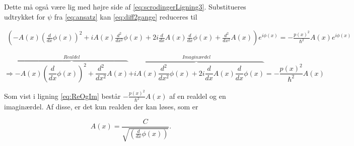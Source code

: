 Dette må også være lig med højre side af \cref{eq:scrodingerLigning3}. Substitueres udtrykket for $\psi$ fra \cref{eq:ansatz} kan \cref{eq:diff2gange} reduceres til

\begin{align}
    \left(- A{\left (x \right )} \left(\frac{d}{d x} \phi{\left (x \right )}\right)^{2} + i A{\left (x \right )} \frac{d^{2}}{d x^{2}}  \phi{\left (x \right )} + 2 i \frac{d}{d x} A{\left (x \right )} \frac{d}{d x} \phi{\left (x \right )} + \frac{d^{2}}{d x^{2}}  A{\left (x \right )}\right) e^{i \phi{\left (x \right )}} = - \frac{p(x)^2}{\hbar^2} A(x) e^{i \phi(x)}
    \label{eq:udskrevet}
\end{align}

\begin{equation}
     \Rightarrow
     \overbrace{- A{\left(x \right)} \left(\frac{d}{d x} \phi{\left(x \right)}\right)^{2}
     + \frac{d^{2}}{d x^{2}}  A{\left (x \right )}}^{Realdel}
     \overbrace{+ i A{\left(x \right)} \frac{d^{2}}{d x^{2}}  \phi{\left(x \right)}
     + 2 i \frac{d}{d x} A{\left(x \right)} \frac{d}{d x} \phi{\left (x \right )}}^{Imaginærdel}
     = - \frac{p(x)^2}{\hbar^2} A(x)
     \label{eq:ReOgIm}
\end{equation}

Som vist i ligning \cref{eq:ReOgIm} består $- \frac{p(x)^2}{\hbar^2} A(x)$ af en realdel og en imaginærdel. Af disse, er det kun realden der kan løses, som er

%


\begin{equation}
    A(x) = \frac{C}{\sqrt{(\frac{d}{d x} \phi{\left (x \right )})}}.
    \label{eq:ImLoes}
\end{equation}

